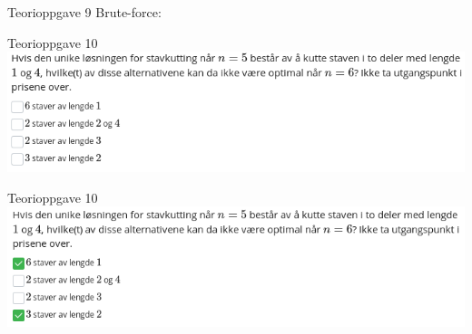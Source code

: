 \documentclass[14pt]{beamer}
\begin{document}
\begin{frame}[fragile]{Teorioppgave 9}
    Brute-force:

\end{frame}
\begin{frame}[fragile]{Teorioppgave 10}
    \includegraphics[width=\textwidth]{06t_q10.png}
\end{frame}
\begin{frame}[fragile]{Teorioppgave 10}
    \includegraphics[width=\textwidth]{06t_q10_sol.png}
\end{frame}
\end{document}
